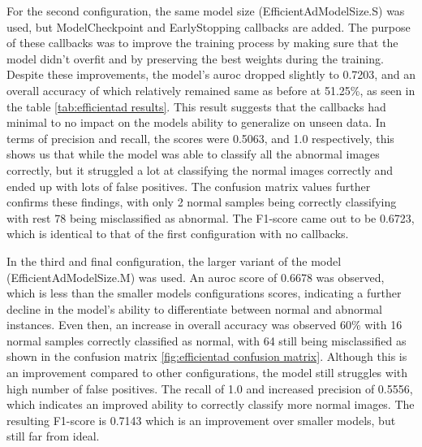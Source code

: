 For the second configuration, the same model size (EfficientAdModelSize.S) was used, but ModelCheckpoint and EarlyStopping callbacks are added. The purpose of these callbacks was to improve the training process by making sure that the model didn't overfit and by preserving the best weights during the training. Despite these improvements, the model's \gls{auroc} dropped slightly to 0.7203, and an overall accuracy of which relatively remained same as before at 51.25\%, as seen in the table \ref{tab:efficientad results}. This result suggests that the callbacks had minimal to no impact on the models ability to generalize on unseen data. In terms of precision and recall, the scores were 0.5063, and 1.0 respectively, this shows us that while the model was able to classify all the abnormal images correctly, but it struggled a lot at classifying the normal images correctly and ended up with lots of false positives. The confusion matrix values further confirms these findings, with only 2 normal samples being correctly classifying with rest 78 being misclassified as abnormal. The F1-score came out to be 0.6723, which is identical to that of the first configuration with no callbacks.

In the third and final configuration, the larger variant of the model (EfficientAdModelSize.M) was used. An \gls{auroc} score of 0.6678 was observed, which is less than the smaller models configurations scores, indicating a further decline in the model's ability to differentiate between normal and abnormal instances. Even then, an increase in overall accuracy was observed 60\% with 16 normal samples correctly classified as normal, with 64 still being misclassified as shown in the confusion matrix \ref{fig:efficientad confusion matrix}. Although this is an improvement compared to other configurations, the model still struggles with high number of false positives. The recall of 1.0 and increased precision of 0.5556, which indicates an improved ability to correctly classify more normal images. The resulting F1-score is 0.7143 which is an improvement over smaller models, but still far from ideal.

